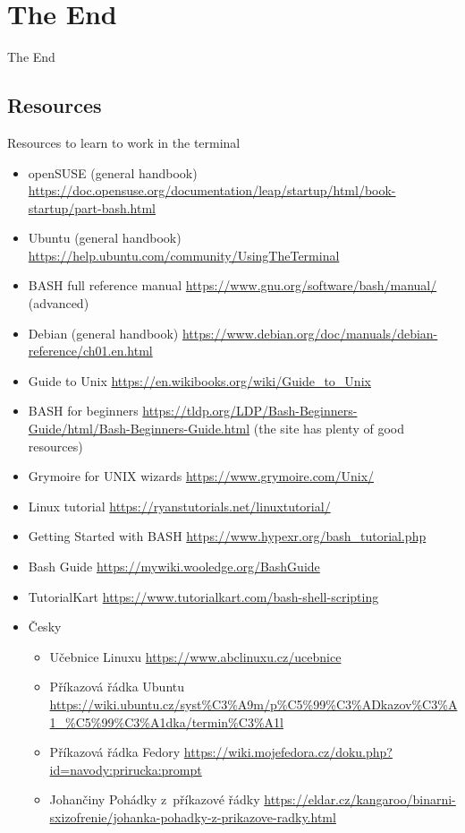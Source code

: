 \documentclass[compress, ucs, xelatex, 11pt, xcolor=svgnames, aspectratio=169,
	hyperref={
		bookmarks=true,
		unicode=true,
		colorlinks=true,
		pdftitle={Linux, command line and MetaCentrum},
		plainpages=false,
		pdfauthor={Vojtech Zeisek},
		pdfsubject={Course about use of Linux command line, writing shell scripts and using MetaCentrum of CESNET},
		pdfcreator={XeLaTeX},
		pdfkeywords={Linux, GNU, BASH, shell, command line, MetaCentrum},
		linkcolor=DarkRed, %
		anchorcolor=DarkBlue, %
		citecolor=Indigo, %
		filecolor=NavyBlue, %
		menucolor=DarkMagenta, %
		urlcolor=DarkBlue, %
		pdftex},
	url={hyphens, lowtilde} %
	]{beamer}
\begin{document}
\section{The End}

\begin{frame}{The End}
	\tableofcontents[currentsection, sectionstyle=show/hide, hideothersubsections]
\end{frame}

\subsection{Resources}

\begin{frame}[allowframebreaks]{Resources to learn to work in the terminal}
	\begin{itemize}
		\item openSUSE (general handbook) \url{https://doc.opensuse.org/documentation/leap/startup/html/book-startup/part-bash.html}
		\item Ubuntu (general handbook) \url{https://help.ubuntu.com/community/UsingTheTerminal}
		\item BASH full reference manual \url{https://www.gnu.org/software/bash/manual/} (advanced)
		\item Debian (general handbook) \url{https://www.debian.org/doc/manuals/debian-reference/ch01.en.html}
		\item Guide to Unix \url{https://en.wikibooks.org/wiki/Guide_to_Unix}
		\item BASH for beginners \url{https://tldp.org/LDP/Bash-Beginners-Guide/html/Bash-Beginners-Guide.html} (the site has plenty of good resources)
		\item Grymoire for UNIX wizards \url{https://www.grymoire.com/Unix/}
		\item Linux tutorial \url{https://ryanstutorials.net/linuxtutorial/}
		\item Getting Started with BASH \url{https://www.hypexr.org/bash_tutorial.php}
		\item Bash Guide \url{https://mywiki.wooledge.org/BashGuide}
		\item TutorialKart \url{https://www.tutorialkart.com/bash-shell-scripting}
		\item Česky
		\begin{itemize}
			\item Učebnice Linuxu \url{https://www.abclinuxu.cz/ucebnice}
			\item Příkazová řádka Ubuntu \url{https://wiki.ubuntu.cz/syst\%C3\%A9m/p\%C5\%99\%C3\%ADkazov\%C3\%A1_\%C5\%99\%C3\%A1dka/termin\%C3\%A1l}
			\item Příkazová řádka Fedory \url{https://wiki.mojefedora.cz/doku.php?id=navody:prirucka:prompt}
			\item Johančiny Pohádky z~příkazové řádky \url{https://eldar.cz/kangaroo/binarni-sxizofrenie/johanka-pohadky-z-prikazove-radky.html}
		\end{itemize}
	\end{itemize}
\end{frame}
\end{document}
